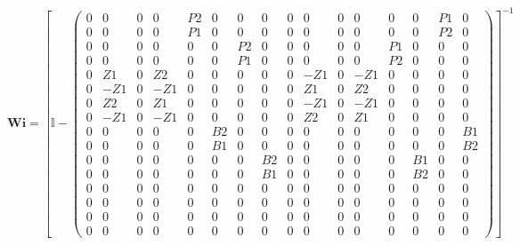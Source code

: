 \[ \mathbf{Wi} =  \left[ \mathbb{I}  -
\left(\begin{array}{cccccccccccccccc} 0 & 0 & 0 & 0 & P2 & 0 & 0 & 0 &
0 & 0 & 0 & 0 & 0 & 0 & P1 & 0 \\ 0 & 0 & 0 & 0 & P1 & 0 & 0 & 0 & 0 &
0 & 0 & 0 & 0 & 0 & P2 & 0 \\ 0 & 0 & 0 & 0 & 0 & 0 & P2 & 0 & 0 & 0 &
0 & 0 & P1 & 0 & 0 & 0 \\ 0 & 0 & 0 & 0 & 0 & 0 & P1 & 0 & 0 & 0 & 0 &
0 & P2 & 0 & 0 & 0 \\ 0 & Z1 & 0 & Z2 & 0 & 0 & 0 & 0 & 0 & -Z1 & 0 &
-Z1 & 0 & 0 & 0 & 0 \\ 0 & -Z1 & 0 & -Z1 & 0 & 0 & 0 & 0 & 0 & Z1 & 0
& Z2 & 0 & 0 & 0 & 0 \\ 0 & Z2 & 0 & Z1 & 0 & 0 & 0 & 0 & 0 & -Z1 & 0
& -Z1 & 0 & 0 & 0 & 0 \\ 0 & -Z1 & 0 & -Z1 & 0 & 0 & 0 & 0 & 0 & Z2 &
0 & Z1 & 0 & 0 & 0 & 0 \\ 0 & 0 & 0 & 0 & 0 & B2 & 0 & 0 & 0 & 0 & 0 &
0 & 0 & 0 & 0 & B1 \\ 0 & 0 & 0 & 0 & 0 & B1 & 0 & 0 & 0 & 0 & 0 & 0 &
0 & 0 & 0 & B2 \\ 0 & 0 & 0 & 0 & 0 & 0 & 0 & B2 & 0 & 0 & 0 & 0 & 0 &
B1 & 0 & 0 \\ 0 & 0 & 0 & 0 & 0 & 0 & 0 & B1 & 0 & 0 & 0 & 0 & 0 & B2
& 0 & 0 \\ 0 & 0 & 0 & 0 & 0 & 0 & 0 & 0 & 0 & 0 & 0 & 0 & 0 & 0 & 0 &
0 \\ 0 & 0 & 0 & 0 & 0 & 0 & 0 & 0 & 0 & 0 & 0 & 0 & 0 & 0 & 0 & 0 \\
0 & 0 & 0 & 0 & 0 & 0 & 0 & 0 & 0 & 0 & 0 & 0 & 0 & 0 & 0 & 0 \\ 0 & 0
& 0 & 0 & 0 & 0 & 0 & 0 & 0 & 0 & 0 & 0 & 0 & 0 & 0 & 0
\end{array}\right) \right]^{-1}  \]
